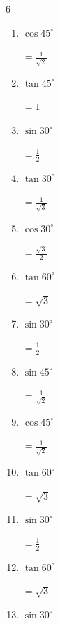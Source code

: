 \begin{multicols}{6}
\begin{enumerate}
        $\displaystyle =\frac{1}{2}$

  \item $\displaystyle \cos{45^\circ}$

        $\displaystyle =\frac{1}{\sqrt{2}}$

  \item $\displaystyle \tan{45^\circ}$

        $\displaystyle =1$

  \item $\displaystyle \sin{30^\circ}$

        $\displaystyle =\frac{1}{2}$

  \item $\displaystyle \tan{30^\circ}$

        $\displaystyle =\frac{1}{\sqrt{3}}$

  \item $\displaystyle \cos{30^\circ}$

        $\displaystyle =\frac{\sqrt{3}}{2}$

\columnbreak %

\resetques

  \item $\displaystyle \tan{60^\circ}$

        $\displaystyle =\sqrt{3}$

  \item $\displaystyle \sin{30^\circ}$

        $\displaystyle =\frac{1}{2}$

  \item $\displaystyle \sin{45^\circ}$

        $\displaystyle =\frac{1}{\sqrt{2}}$

  \item $\displaystyle \cos{45^\circ}$

        $\displaystyle =\frac{1}{\sqrt{2}}$

  \item $\displaystyle \tan{60^\circ}$

        $\displaystyle =\sqrt{3}$

  \item $\displaystyle \sin{30^\circ}$

        $\displaystyle =\frac{1}{2}$

  \item $\displaystyle \tan{60^\circ}$

        $\displaystyle =\sqrt{3}$

  \item $\displaystyle \sin{30^\circ}$


\end{enumerate}
\end{multicols}
